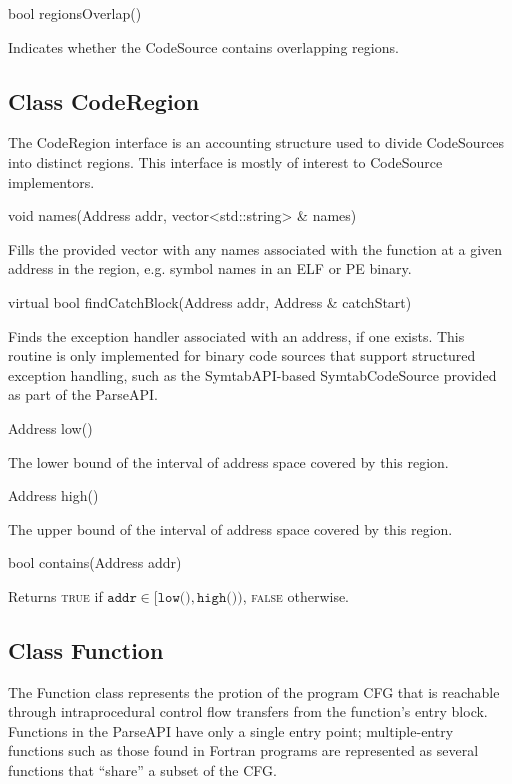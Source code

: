 \documentclass{article}
\newenvironment{apient}{\small\verbatim}{\endverbatim}
\newcommand{\apidesc}[1]{%
{\addtolength{\leftskip}{4em}%
#1\par\medskip}
}
\begin{document}
\begin{apient}
bool regionsOverlap() 
\end{apient}
\apidesc{Indicates whether the CodeSource contains overlapping regions.}

\subsection{Class CodeRegion}

The CodeRegion interface is an accounting structure used to divide CodeSources into distinct regions. This interface is mostly of interest to CodeSource implementors.

\begin{apient}
void names(Address addr, vector<std::string> & names)
\end{apient}
\apidesc{Fills the provided vector with any names associated with the function at a given address in the region, e.g. symbol names in an ELF or PE binary.}

\begin{apient}
virtual bool findCatchBlock(Address addr, Address & catchStart)
\end{apient}
\apidesc{Finds the exception handler associated with an address, if one exists. This routine is only implemented for binary code sources that support structured exception handling, such as the SymtabAPI-based SymtabCodeSource provided as part of the ParseAPI.}

\begin{apient}
Address low()
\end{apient}
\apidesc{The lower bound of the interval of address space covered by this region.}

\begin{apient}
Address high()
\end{apient}
\apidesc{The upper bound of the interval of address space covered by this region.}

\begin{apient}
bool contains(Address addr)
\end{apient}
\apidesc{Returns {\scshape true} if $\texttt{addr} \in [\texttt{low()},\texttt{high()})$, {\scshape false} otherwise.}

\subsection{Class Function}

The Function class represents the protion of the program CFG that is reachable through intraprocedural control flow transfers from the function's entry block. Functions in the ParseAPI have only a single entry point; multiple-entry functions such as those found in Fortran programs are represented as several functions that ``share'' a subset of the CFG. 
\end{document}
